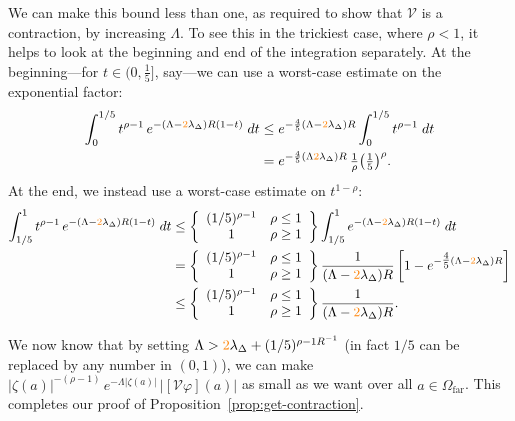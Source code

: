 \documentclass{article}
\theoremstyle{plain}
\newcommand{\volterra}{\mathcal{V}}
\newcommand{\far}{\Omega_\text{far}}
\begin{document}
We can make this bound less than one, as required to show that $\volterra$ is a contraction, by increasing $\Lambda$. To see this in the trickiest case, where $\rho < 1$, it helps to look at the beginning and end of the integration separately. At the beginning---for $t \in \big(0, \tfrac{1}{5}\big]$, say---we can use a worst-case estimate on the exponential factor:
\begin{align*}
\int_0^{1/5} t^{\rho-1}\,e^{-(\Lambda - \textcolor{orange}{2} \lambda_\Delta)R(1 - t)}\;dt & \le e^{-\frac{4}{5}(\Lambda -\textcolor{orange}{2} \lambda_\Delta)R} \int_0^{1/5} t^{\rho-1}\;dt \\
& = e^{-\frac{4}{5}(\Lambda \textcolor{orange}{2} \lambda_\Delta)R}\,\tfrac{1}{\rho} \big(\tfrac{1}{5}\big)^\rho.
\end{align*}
At the end, we instead use a worst-case estimate on $t^{1-\rho}$:
\begin{align*}
\int_{1/5}^1 t^{\rho-1}\,e^{-(\Lambda - \textcolor{orange}{2}\lambda_\Delta)R(1 - t)}\;dt & \le \left\{\begin{array}{cc}(1/5)^{\rho-1} & \rho \le 1 \\ 1 & \rho \ge 1 \end{array}\right\} \int_{1/5}^1 e^{-(\Lambda -\textcolor{orange}{2} \lambda_\Delta)R(1 - t)}\;dt \\
& = \left\{\begin{array}{cc}(1/5)^{\rho-1} & \rho \le 1 \\ 1 & \rho \ge 1 \end{array}\right\} \frac{1}{(\Lambda - \textcolor{orange}{2}\lambda_\Delta)R}\left[ 1 - e^{-\tfrac{4}{5}(\Lambda - \textcolor{orange}{2}\lambda_\Delta)R} \right] \\
& \le \left\{\begin{array}{cc}(1/5)^{\rho-1} & \rho \le 1 \\ 1 & \rho \ge 1 \end{array}\right\} \frac{1}{(\Lambda - \textcolor{orange}{2}\lambda_\Delta)R}.
\end{align*}

We now know that by setting $\Lambda > \textcolor{orange}{2}\lambda_\Delta+ (1/5)^{\rho-1 R^{-1}}$ (in fact $1/5$ can be replaced by any number in $(0,1)$), we can make $|\zeta(a)|^{-(\rho-1)}\,e^{-\Lambda|\zeta(a)|}\,|[\volterra\varphi](a)|$ as small as we want over all $a \in \far$. This completes our proof of Proposition~\ref{prop:get-contraction}.
\end{document}
